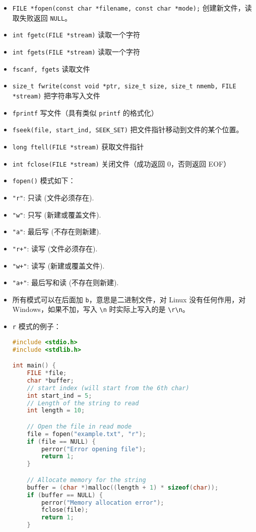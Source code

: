 
\begin{itemize}
\item \verb`FILE *fopen(const char *filename, const char *mode);` 创建新文件，读取失败返回 \verb`NULL`。
\item \verb`int fgetc(FILE *stream)` 读取一个字符
\item \verb`int fgets(FILE *stream)` 读取一个字符
\item \verb`fscanf, fgets` 读取文件
\item \verb`size_t fwrite(const void *ptr, size_t size, size_t nmemb, FILE *stream)` 把字符串写入文件
\item \verb`fprintf` 写文件（具有类似 \verb`printf` 的格式化）
\item \verb`fseek(file, start_ind, SEEK_SET)` 把文件指针移动到文件的某个位置。
\item \verb`long ftell(FILE *stream)` 获取文件指针
\item \verb`int fclose(FILE *stream)` 关闭文件（成功返回 0，否则返回 EOF）
\item \verb`fopen()` 模式如下：
\item \verb`"r"`: 只读 (文件必须存在).
\item \verb`"w"`: 只写 (新建或覆盖文件).
\item \verb`"a"`: 最后写 (不存在则新建).
\item \verb`"r+"`: 读写 (文件必须存在).
\item \verb`"w+"`: 读写 (新建或覆盖文件).
\item \verb`"a+"`: 最后写和读 (不存在则新建).
\item 所有模式可以在后面加 \verb`b`，意思是二进制文件，对 Linux 没有任何作用，对 Windows，如果不加，写入 \verb`\n` 时实际上写入的是 \verb`\r\n`。
\item \verb`r` 模式的例子：
\begin{lstlisting}[language=cpp]
#include <stdio.h>
#include <stdlib.h>

int main() {
    FILE *file;
    char *buffer;
    // start index (will start from the 6th char)
    int start_ind = 5;
    // Length of the string to read
    int length = 10;

    // Open the file in read mode
    file = fopen("example.txt", "r");
    if (file == NULL) {
        perror("Error opening file");
        return 1;
    }

    // Allocate memory for the string
    buffer = (char *)malloc((length + 1) * sizeof(char));
    if (buffer == NULL) {
        perror("Memory allocation error");
        fclose(file);
        return 1;
    }


\end{lstlisting}
\end{itemize}

